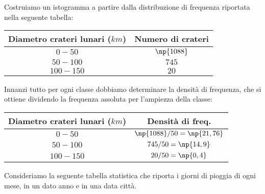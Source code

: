 \begin{exrig}
 \begin{esempio}

Costruiamo un istogramma a partire dalla distribuzione di frequenza riportata nella seguente tabella:
\begin{center}
\begin{tabular}{cc}
\toprule
Diametro crateri lunari ($\unit{km}$) & Numero di crateri\\
\midrule
$0-50$ & $\np{1088}$ \\
$50-100$ & $745$ \\
$100-150$ & $20$ \\
\bottomrule
\end{tabular}
\end{center}

Innanzi tutto per ogni classe dobbiamo determinare la densità di frequenza, che si ottiene dividendo la frequenza assoluta per l'ampiezza della classe:

\begin{center}
\begin{tabular}{cc}
\toprule
Diametro crateri lunari ($\unit{km}$) & Densità di freq.\\
\midrule
$0-50$ & $\np{1088}/50=\np{21,76}$ \\
$50-100$ & $745/50=\np{14,9}$ \\
$100-150$ & $20/50=\np{0,4}$ \\
\bottomrule
\end{tabular}
\end{center}

\begin{center}

\end{center}
\end{esempio}

\begin{esempio}
Consideriamo la seguente tabella statistica che riporta i giorni di pioggia di ogni mese, in un dato anno e in una data città.


\end{esempio}
\end{exrig}
